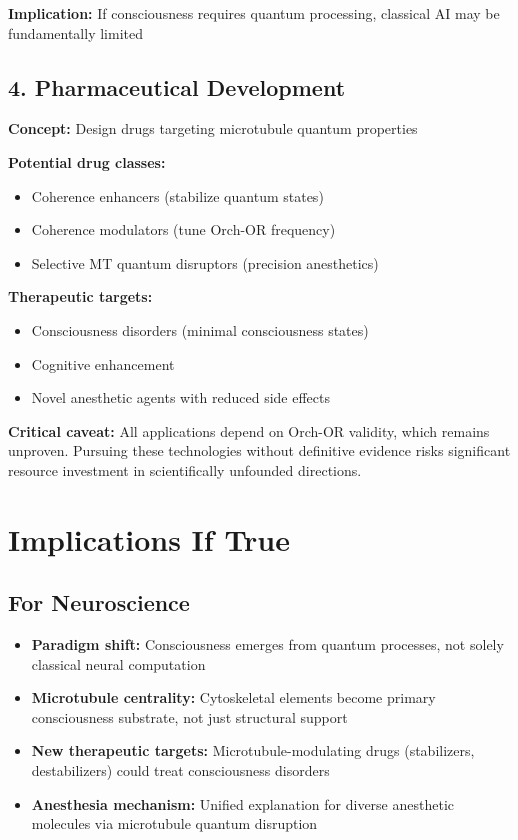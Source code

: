 \textbf{Implication:} If consciousness requires quantum processing, classical AI may be fundamentally limited

\subsection{4. Pharmaceutical Development}

\textbf{Concept:} Design drugs targeting microtubule quantum properties

\textbf{Potential drug classes:}
\begin{itemize}
\item Coherence enhancers (stabilize quantum states)
\item Coherence modulators (tune Orch-OR frequency)
\item Selective MT quantum disruptors (precision anesthetics)
\end{itemize}

\textbf{Therapeutic targets:}
\begin{itemize}
\item Consciousness disorders (minimal consciousness states)
\item Cognitive enhancement
\item Novel anesthetic agents with reduced side effects
\end{itemize}

\begin{warningbox}
\textbf{Critical caveat:} All applications depend on Orch-OR validity, which remains unproven. Pursuing these technologies without definitive evidence risks significant resource investment in scientifically unfounded directions.
\end{warningbox}

\section{Implications If True}

\subsection{For Neuroscience}

\begin{itemize}
\item \textbf{Paradigm shift:} Consciousness emerges from quantum processes, not solely classical neural computation
\item \textbf{Microtubule centrality:} Cytoskeletal elements become primary consciousness substrate, not just structural support
\item \textbf{New therapeutic targets:} Microtubule-modulating drugs (stabilizers, destabilizers) could treat consciousness disorders
\item \textbf{Anesthesia mechanism:} Unified explanation for diverse anesthetic molecules via microtubule quantum disruption
\end{itemize}


